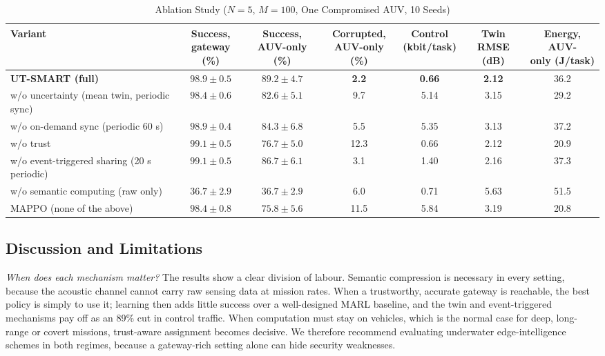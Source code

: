\documentclass[lettersize,journal]{IEEEtran}
\begin{document}
\begin{table}[!t]
\centering
\caption{Ablation Study ($N=5$, $M=100$, One Compromised AUV, 10 Seeds)}
\label{tab:ablation}
\begin{tabular}{@{}lcccccc@{}}
\toprule
Variant & \shortstack{Success,\\gateway (\%)} & \shortstack{Success,\\AUV-only (\%)} & \shortstack{Corrupted,\\AUV-only (\%)} & \shortstack{Control\\(kbit/task)} & \shortstack{Twin\\RMSE (dB)} & \shortstack{Energy, AUV-\\only (J/task)}\\
\midrule
\textbf{UT-SMART (full)} & $\mathbf{98.9\pm0.5}$ & $\mathbf{89.2\pm4.7}$ & \textbf{2.2} & \textbf{0.66} & \textbf{2.12} & 36.2\\
w/o uncertainty (mean twin, periodic sync) & $98.4\pm0.6$ & $82.6\pm5.1$ & 9.7 & 5.14 & 3.15 & 29.2\\
w/o on-demand sync (periodic 60 s) & $98.9\pm0.4$ & $84.3\pm6.8$ & 5.5 & 5.35 & 3.13 & 37.2\\
w/o trust & $99.1\pm0.5$ & $76.7\pm5.0$ & 12.3 & 0.66 & 2.12 & 20.9\\
w/o event-triggered sharing (20 s periodic) & $99.1\pm0.5$ & $86.7\pm6.1$ & 3.1 & 1.40 & 2.16 & 37.3\\
w/o semantic computing (raw only) & $36.7\pm2.9$ & $36.7\pm2.9$ & 6.0 & 0.71 & 5.63 & 51.5\\
MAPPO (none of the above) & $98.4\pm0.8$ & $75.8\pm5.6$ & 11.5 & 5.84 & 3.19 & 20.8\\
\bottomrule
\end{tabular}
\end{table}

\subsection{Discussion and Limitations}\label{sec:disc}

\emph{When does each mechanism matter?} The results show a clear division of labour. Semantic compression is necessary in every setting, because the acoustic channel cannot carry raw sensing data at mission rates. When a trustworthy, accurate gateway is reachable, the best policy is simply to use it; learning then adds little success over a well-designed MARL baseline, and the twin and event-triggered mechanisms pay off as an 89\% cut in control traffic. When computation must stay on vehicles, which is the normal case for deep, long-range or covert missions, trust-aware assignment becomes decisive. We therefore recommend evaluating underwater edge-intelligence schemes in both regimes, because a gateway-rich setting alone can hide security weaknesses.
\end{document}
